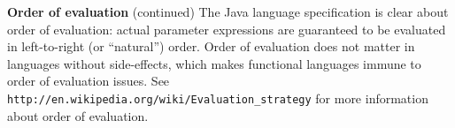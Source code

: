 \begin{minipage}[t]{\sw}
\slidenumber
\LARGE
{\bf Order of evaluation} (continued)\exx
The Java language specification is clear about order of evaluation:
actual parameter expressions are guaranteed
to be evaluated in left-to-right (or ``natural'') order.\exx
Order of evaluation does not matter in languages without side-effects,
which makes functional languages immune to order of evaluation issues.\exx
See \verb'http://en.wikipedia.org/wiki/Evaluation_strategy'
for more information about order of evaluation.
\end{minipage}
